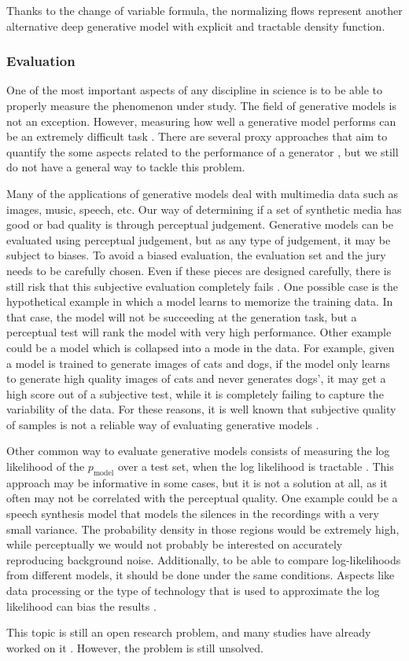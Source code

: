 Thanks to the change of variable formula, the normalizing flows represent another alternative deep generative model with explicit and tractable density function.

\subsubsection{Evaluation} \label{sec:dgmevaluation}
One of the most important aspects of any discipline in science is to be able to properly measure the phenomenon under study. The field of generative models is not an exception. However, measuring how well a generative model performs can be an extremely difficult task \cite{Goodfellow2016}. There are several proxy approaches that aim to quantify the some aspects related to the performance of a generator \cite{theis2016a}, but we still do not have a general way to tackle this problem.

Many of the applications of generative models deal with multimedia data such as images, music, speech, etc. Our way of determining if a set of synthetic media has good or bad quality is through perceptual judgement. Generative models can be evaluated using perceptual judgement, but as any type of judgement, it may be subject to biases. To avoid a biased evaluation, the evaluation set and the jury needs to be carefully chosen. Even if these pieces are designed carefully, there is still risk that this subjective evaluation completely fails \cite{Goodfellow2016}. One possible case is the hypothetical example in which a model learns to memorize the training data. In that case, the model will not be succeeding at the generation task, but a perceptual test will rank the model with very high performance. Other example could be a model which is collapsed into a mode in the data. For example, given a model is trained to generate images of cats and dogs, if the model only learns to generate high quality images of cats and never generates dogs', it may get a high score out of a subjective test, while it is completely failing to capture the variability of the data. For these reasons, it is well known that subjective quality of samples is not a reliable way of evaluating generative models \cite{denton2015}.

Other common way to evaluate generative models consists of measuring the log likelihood of the $p_\mathrm{model}$ over a test set, when the log likelihood is tractable \cite{Goodfellow2016}. This approach may be informative in some cases, but it is not a solution at all, as it often may not be correlated with the perceptual quality. One example could be a speech synthesis model that models the silences in the recordings with a very small variance. The probability density in those regions would be extremely high, while perceptually we would not probably be interested on accurately reproducing background noise. Additionally, to be able to compare log-likelihoods from different models, it should be done under the same conditions. Aspects like data processing or the type of technology that is used to approximate the log likelihood can bias the results \cite{Goodfellow2016}.

This topic is still an open research problem, and many studies have already worked on it \cite{theis2016a, sajjadi2018}. However, the problem is still unsolved.



